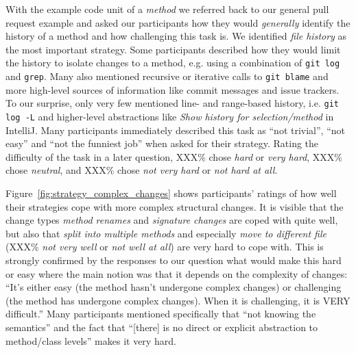 


\noindent
With the example code unit of a \textit{method} we referred back to our general pull request example and asked our participants how they would \textit{generally} identify the history of a method and how challenging this task is. We identified \textit{file history} as the most important strategy. Some participants described how they would limit the history to isolate changes to a method, e.g. using a combination of \texttt{git log} and \texttt{grep}. Many also mentioned recursive or iterative calls to \texttt{git blame} and more high-level sources of information like commit messages and issue trackers. To our surprise, only very few mentioned line- and range-based history, i.e. \texttt{git log -L} and higher-level abstractions like \textit{Show history for selection/method} in IntelliJ. Many participants immediately described this task as ``not trivial'', ``not easy'' and ``not the funniest job''  when asked for their strategy. Rating the difficulty of the task in a later question, XXX\% chose \textit{hard} or \textit{very hard}, XXX\% chose \textit{neutral}, and XXX\% chose \textit{not very hard} or \textit{not hard at all}.


Figure~\ref{fig:strategy_complex_changes} shows participants' ratings of how well their strategies cope with more complex structural changes. It is visible that the change types \textit{method renames} and \textit{signature changes} are coped with quite well, but also that \textit{split into multiple methods} and especially \textit{move to different file} (XXX\% \textit{not very well} or \textit{not well at all}) are very hard to cope with. This is strongly confirmed by the responses to our question what would make this hard or easy where the main notion was that it depends on the complexity of changes: ``It's either easy (the method hasn't undergone complex changes) or challenging (the method has undergone complex changes). When it is challenging, it is VERY difficult.'' Many participants mentioned specifically that ``not knowing the semantics'' and the fact that ``[there] is no direct or explicit abstraction to method/class levels'' makes it very hard.

